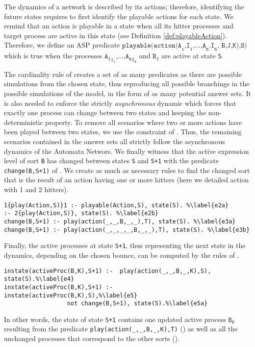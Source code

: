 The dynamics of a network is described by its actions; therefore, identifying the future states requires to first identify the playable actions for each state. We remind that an action is playable in a state when all its hitter processes and target process are active in this state (see Definition \ref{def:playableAction}). Therefore, we define an ASP predicate $\texttt{playable(action(A}_\texttt{1}\texttt{,I}_\texttt{1}\texttt{,...,A}_\texttt{n}\texttt{,I}_\texttt{n}\texttt{, B,J,K),S)}$ which is true when the processes  ${\texttt{A}_\texttt{1}}_{\texttt{I}_\texttt{1}}\texttt{,...,}{\texttt{A}_\texttt{n}}_{\texttt{I}_\texttt{n}}$ and $\texttt{B}_\texttt{J}$ are active at state \texttt{S}.

The cardinality rule of 
creates a set of as many predicates as there are possible simulations from the chosen state,
thus reproducing all possible branchings in the possible simulations of the model, in the form of as many potential answer sets. It is also needed to enforce the strictly \emph{asynchronous} dynamic
which forces that exactly one process can change between two states and keeping the non-deterministic property.
To remove all scenarios where two or more actions have been played between
two states, we use the constraint of .
Thus, the remaining scenarios contained in the answer sets all strictly follow
the asynchronous dynamics of the Automata Networs.
We finally witness that the active expression level of sort \texttt{B} has changed between states \texttt{S} and \texttt{S+1} with the predicate \texttt{change(B,S+1)} of . We create as much as necessary rules to find the changed sort that is the result of an action having one or more hitters (here we detailed action with 1 and 2 hitters).

\begin{lstlisting}
1{play(Action,S)}1 :- playable(Action,S), state(S). %\label{e2a} 
:- 2{play(Action,S)}, state(S). %\label{e2b}
change(B,S+1) :- play(action(_,_,B,_,_),T), state(S). %\label{e3a}
change(B,S+1) :- play(action(_,_,_,_,B,_,_),T), state(S). %\label{e3b}
\end{lstlisting}

Finally, the active processes at state \texttt{S+1},
thus representing the next state in the dynamics, depending on the chosen bounce,
can be computed by the rules of .
\begin{lstlisting}
instate(activeProc(B,K),S+1) :-  play(action(_,_,B,_,K),S), state(S).%\label{e4}
instate(activeProc(B,K),S+1) :-  instate(activeProc(B,K),S),%\label{e5}
				  not change(B,S+1), state(S).%\label{e5a}
\end{lstlisting}
In other words, the state of state \texttt{S+1} contains one updated active process $\texttt{B}_\texttt{K}$
resulting from the predicate \texttt{play(action(\_,\_,B,\_,K),T)} ()
as well as all the unchanged processes that correspond to the other sorts ().

